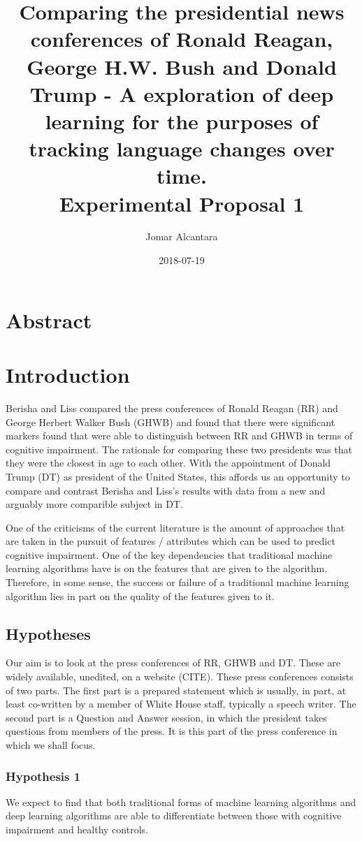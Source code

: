 \documentclass{article}
\title{Comparing the presidential news conferences of Ronald Reagan, George H.W. Bush and Donald Trump - A exploration of deep learning for the purposes of tracking language changes over time.\newline \\\large Experimental Proposal 1 }
\date{2018-07-19}
\author{Jomar Alcantara}
\begin{document}
\maketitle
\newpage
\tableofcontents
\newpage
\section{Abstract}
\section{Introduction}

Berisha and Liss compared the press conferences of Ronald Reagan (RR) and George Herbert Walker Bush (GHWB) and found that there were significant markers found that were able to distinguish between RR and GHWB in terms of cognitive impairment. The rationale for comparing these two presidents was that they were the closest in age to each other. With the appointment of Donald Trump (DT) as president of the United States, this affords us an opportunity to compare and contrast Berisha and Liss's results with data from a new and arguably more comparible subject in DT.\newline
\par 
One of the criticisms of the current literature is the amount of approaches that are taken in the pursuit of features / attributes which can be used to predict cognitive impairment. One of the key dependencies that traditional machine learning algorithms have is on the features that are given to the algorithm. Therefore, in some sense, the success or failure of a traditional machine learning algorithm lies in part on the quality of the features given to it. 
\subsection{Hypotheses}
Our aim is to look at the press conferences of RR, GHWB and DT. These are widely available, unedited, on a website (CITE). These press conferences consists of two parts. The first part is a prepared statement which is usually, in part, at least co-written by a member of White House staff, typically a speech writer. The second part is a Question and Answer session, in which the president takes questions from members of the press. It is this part of the press conference in which we shall focus.
\subsubsection{Hypothesis 1}
We expect to find that both traditional forms of machine learning algorithms and deep learning algorithms are able to differentiate between those with cognitive impairment and healthy controls. 
\end{document}
